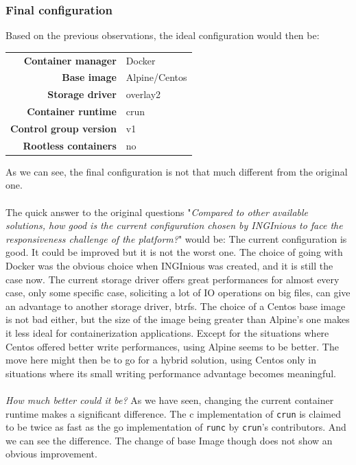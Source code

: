 \subsubsection{Final configuration}

Based on the previous observations, the ideal configuration would then be:

\begin{center}
\begin{tabular}{rl}
  \textbf{Container manager} & Docker \\
  \textbf{Base image} & Alpine/Centos \\
  \textbf{Storage driver} & overlay2 \\
  \textbf{Container runtime} & crun \\
  \textbf{Control group version} & v1 \\
  \textbf{Rootless containers} & no \\
\end{tabular}
\end{center}

As we can see, the final configuration is not that much different from the original one.  
\paragraph{}The quick answer to the original questions "\textit{Compared to other available solutions, how good is the current configuration chosen by INGInious to face the responsiveness challenge of the platform?}" would be:
The current configuration is good.  It could be improved but it is not the worst one.  The choice of going with Docker was the obvious choice when INGInious was created, and it is still the case now.  The current storage driver offers great performances for almost every case, only some specific case, soliciting a lot of IO operations on big files, can give an advantage to another storage driver, btrfs.  The choice of a Centos base image is not bad either, but the size of the image being greater than Alpine's one makes it less ideal for containerization applications.  Except for the situations where Centos offered better write performances, using Alpine seems to be better.  The move here might then be to go for a hybrid solution, using Centos only in situations where its small writing performance advantage becomes meaningful.  
\paragraph{}\textit{How much better could it be?}  As we have seen, changing the current container runtime makes a significant difference.  The c implementation of \texttt{crun} is claimed to be twice as fast as the go implementation of \texttt{runc} by \texttt{crun}'s contributors.  And we can see the difference.  The change of base Image though does not show an obvious improvement.
